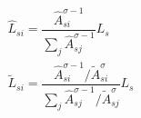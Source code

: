 \begin{gather*}\label{eq:allocation_social_planner_L}
    \hat{L}_{si} = \dfrac{\hat{A}_{si}^{\sigma -1}}{\sum_j \hat{A}_{sj}^{\sigma -1}}L_s\\ 
    \tilde{L}_{si} = \dfrac{\hat{A}_{si}^{\sigma -1}/\tilde{A}_{si}^{\sigma}}{\sum_j \hat{A}_{sj}^{\sigma -1}/ \tilde{A}_{sj}^{\sigma}}L_s
\end{gather*}